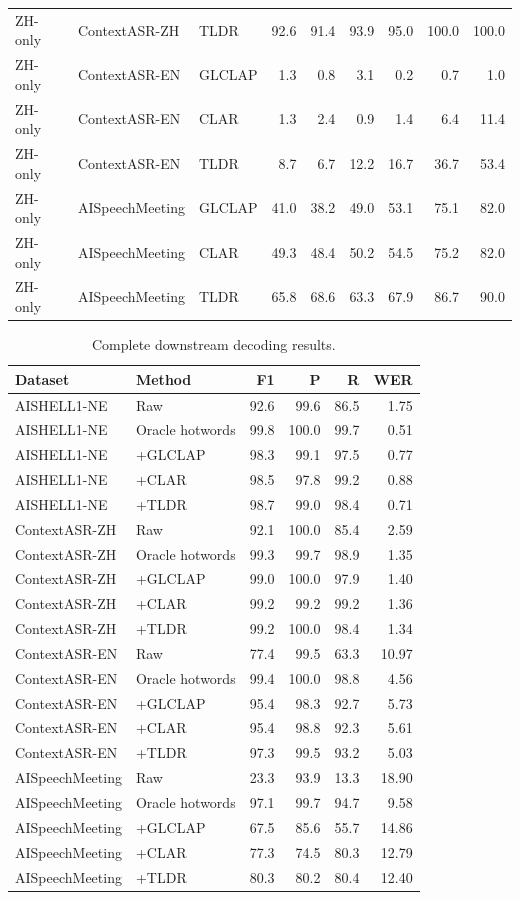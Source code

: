 \begin{table}[t]
\begin{tabular}{lllrrrrrr}
ZH-only & ContextASR-ZH & TLDR & 92.6 & 91.4 & 93.9 & 95.0 & 100.0 & 100.0 \\
ZH-only & ContextASR-EN & GLCLAP & 1.3 & 0.8 & 3.1 & 0.2 & 0.7 & 1.0 \\
ZH-only & ContextASR-EN & CLAR & 1.3 & 2.4 & 0.9 & 1.4 & 6.4 & 11.4 \\
ZH-only & ContextASR-EN & TLDR & 8.7 & 6.7 & 12.2 & 16.7 & 36.7 & 53.4 \\
ZH-only & AISpeechMeeting & GLCLAP & 41.0 & 38.2 & 49.0 & 53.1 & 75.1 & 82.0 \\
ZH-only & AISpeechMeeting & CLAR & 49.3 & 48.4 & 50.2 & 54.5 & 75.2 & 82.0 \\
ZH-only & AISpeechMeeting & TLDR & 65.8 & 68.6 & 63.3 & 67.9 & 86.7 & 90.0 \\
\bottomrule
\end{tabular}
\end{table}
\begin{table}[t]
\centering
\caption{Complete downstream decoding results.}
\label{tab:supp_decoding}
\small
\begin{tabular}{llrrrr}
\toprule
Dataset & Method & F1 & P & R & WER \\
\midrule
AISHELL1-NE & Raw & 92.6 & 99.6 & 86.5 & 1.75 \\
AISHELL1-NE & Oracle hotwords & 99.8 & 100.0 & 99.7 & 0.51 \\
AISHELL1-NE & +GLCLAP & 98.3 & 99.1 & 97.5 & 0.77 \\
AISHELL1-NE & +CLAR & 98.5 & 97.8 & 99.2 & 0.88 \\
AISHELL1-NE & +TLDR & 98.7 & 99.0 & 98.4 & 0.71 \\
ContextASR-ZH & Raw & 92.1 & 100.0 & 85.4 & 2.59 \\
ContextASR-ZH & Oracle hotwords & 99.3 & 99.7 & 98.9 & 1.35 \\
ContextASR-ZH & +GLCLAP & 99.0 & 100.0 & 97.9 & 1.40 \\
ContextASR-ZH & +CLAR & 99.2 & 99.2 & 99.2 & 1.36 \\
ContextASR-ZH & +TLDR & 99.2 & 100.0 & 98.4 & 1.34 \\
ContextASR-EN & Raw & 77.4 & 99.5 & 63.3 & 10.97 \\
ContextASR-EN & Oracle hotwords & 99.4 & 100.0 & 98.8 & 4.56 \\
ContextASR-EN & +GLCLAP & 95.4 & 98.3 & 92.7 & 5.73 \\
ContextASR-EN & +CLAR & 95.4 & 98.8 & 92.3 & 5.61 \\
ContextASR-EN & +TLDR & 97.3 & 99.5 & 93.2 & 5.03 \\
AISpeechMeeting & Raw & 23.3 & 93.9 & 13.3 & 18.90 \\
AISpeechMeeting & Oracle hotwords & 97.1 & 99.7 & 94.7 & 9.58 \\
AISpeechMeeting & +GLCLAP & 67.5 & 85.6 & 55.7 & 14.86 \\
AISpeechMeeting & +CLAR & 77.3 & 74.5 & 80.3 & 12.79 \\
AISpeechMeeting & +TLDR & 80.3 & 80.2 & 80.4 & 12.40 \\
\bottomrule
\end{tabular}
\end{table}

